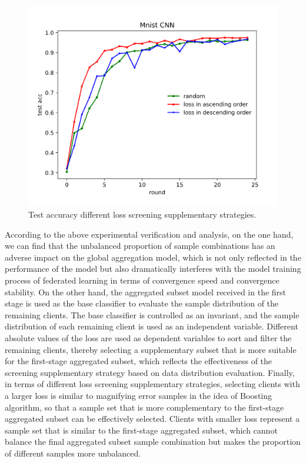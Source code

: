 \documentclass{article}
\begin{document}
\begin{figure}[!htbp]
\vspace{-0.4cm}
	\centering
	\includegraphics[width=0.6\linewidth]{fig11.png}
	\caption{Test accuracy different loss screening supplementary strategies.}
	\label{fig11}
\end{figure}

According to the above experimental verification and analysis, on the one hand, we can find that the unbalanced proportion of sample combinations has an adverse impact on the global aggregation model, which is not only reflected in the performance of the model but also dramatically interferes with the model training process of federated learning in terms of convergence speed and convergence stability. On the other hand, the aggregated subset model received in the first stage is used as the base classifier to evaluate the sample distribution of the remaining clients. The base classifier is controlled as an invariant, and the sample distribution of each remaining client is used as an independent variable. Different absolute values of the loss are used as dependent variables to sort and filter the remaining clients, thereby selecting a supplementary subset that is more suitable for the first-stage aggregated subset, which reflects the effectiveness of the screening supplementary strategy based on data distribution evaluation. Finally, in terms of different loss screening supplementary strategies, selecting clients with a larger loss is similar to magnifying error samples in the idea of Boosting algorithm, so that a sample set that is more complementary to the first-stage aggregated subset can be effectively selected. Clients with smaller loss represent a sample set that is similar to the first-stage aggregated subset, which cannot balance the final aggregated subset sample combination but makes the proportion of different samples more unbalanced. 
\end{document}
